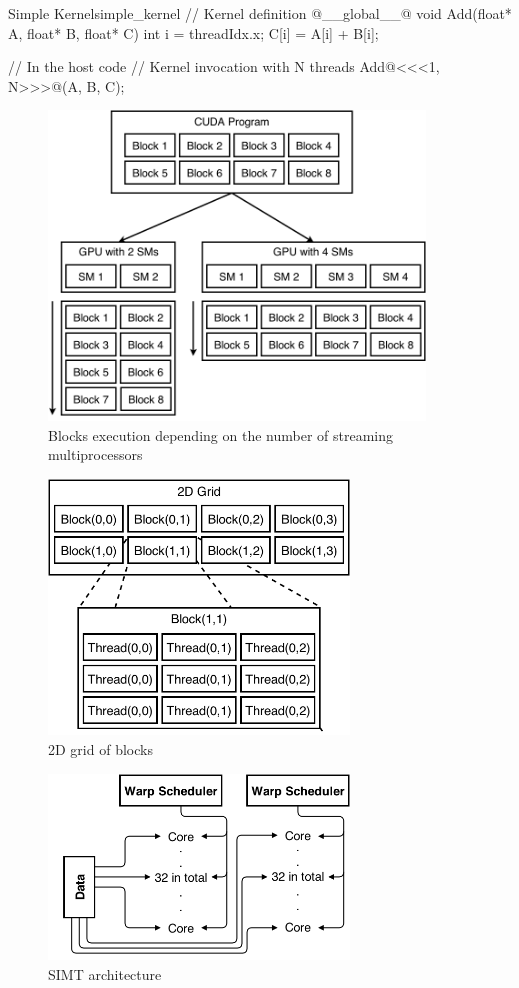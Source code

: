 \documentclass[10pt,a4paper]{report}
\newcounter{example}
\begin{document}
\begin{example}{Simple Kernel}{simple_kernel}
// Kernel definition
@__global__@ void Add(float* A, float* B, float* C)
{
  int i = threadIdx.x;
  C[i] = A[i] + B[i];
}

// In the host code
// Kernel invocation with N threads
Add@<<<1, N>>>@(A, B, C);
\end{example}

\newpage

\begin{figure}[h]
    \centering
    \includegraphics[width=10cm]{grid_scale.png}
    \caption{Blocks execution depending on the number of streaming multiprocessors}
    \label{fig:blocks_scaling}
\end{figure}

\begin{figure}[h]
    \centering
    \includegraphics[width=8cm]{2D_grid.png}
    \caption{2D grid of blocks}
    \label{fig:grid_2d}
\end{figure}

\newpage

\begin{figure}[h]
    \centering
    \includegraphics[width=8cm]{SIMT.png}
    \caption{SIMT architecture}
    \label{fig:SIMT}
\end{figure}
\end{document}
